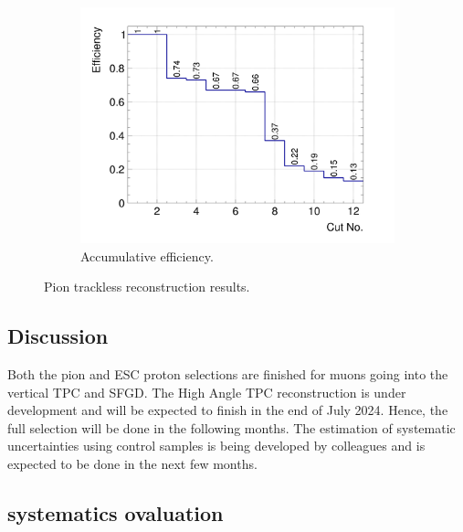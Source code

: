 \begin{figure}[t]
\begin{subfigure}{\trfigwid\textwidth}
                    \label{fig:ppi-res}
               \end{subfigure}
               \begin{subfigure}{\trfigwid\textwidth}
                    \includegraphics[width=\textwidth]{figures/sel/INCL_p_pi_accum_eff_al11.png}
                    \caption{Accumulative efficiency.}
                    \label{fig:tl-accum-eff}
               \end{subfigure}
               \caption{Pion trackless reconstruction results.}
               \label{fig:piTLres}
            \end{figure}


            

    \subsection{Discussion}
        Both the pion and ESC proton selections are finished for muons going into the vertical TPC and SFGD. The High Angle TPC reconstruction is under development and will be expected to finish in the end of July 2024. Hence, the full selection will be done in the following months. The estimation of systematic uncertainties using control samples is being developed by colleagues and is expected to be done in the next few months. 


     \subsection{systematics ovaluation}
          
